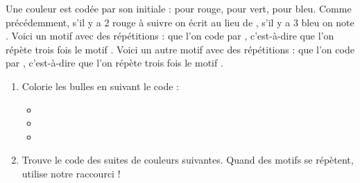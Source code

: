 \documentclass[class=report,crop=false, 12pt]{standalone}
\begin{document}
\begin{activite}
Une couleur est codée par son initiale :  pour rouge,  pour vert,  pour bleu. 
Comme précédemment, s’il y a 2 rouge à suivre on écrit  au lieu de , s’il y a 3 bleu on note .
Voici un motif avec des répétitions :  que l’on code par , c’est-à-dire que l’on répète trois fois le motif . Voici un autre motif avec des répétitions :  que l’on code par , c’est-à-dire que l’on répète trois fois le motif .

\begin{enumerate}

  \item Colorie les bulles en suivant le code :
  \begin{itemize}
    \item {} 
  

    
    \item {}
    
 
    
    \item {}


    
  \end{itemize}
    
  \item Trouve le code des suites de couleurs suivantes. Quand des motifs se répètent, utilise notre raccourci !


\end{enumerate}

\end{activite}
\end{document}
